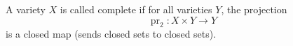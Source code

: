 A variety $X$ is called complete if for all varieties $Y$, the projection
$$\operatorname{pr}_2: X \times Y \rightarrow Y$$
is a closed map (sends closed sets to closed sets).
